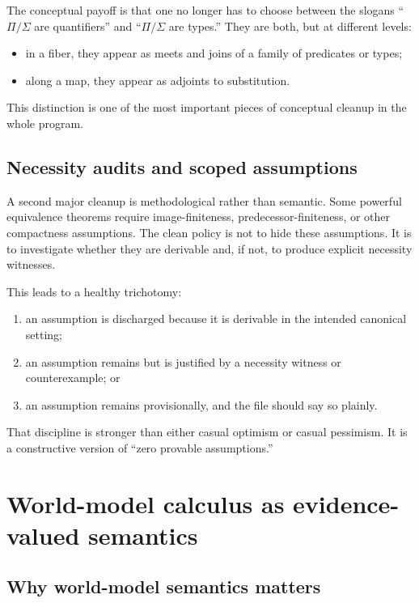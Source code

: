 \documentclass[11pt]{article}
\begin{document}
The conceptual payoff is that one no longer has to choose between the slogans ``$\Pi/\Sigma$ are quantifiers'' and ``$\Pi/\Sigma$ are types.'' They are both, but at different levels:

\begin{itemize}
  \item in a fiber, they appear as meets and joins of a family of predicates or types;
  \item along a map, they appear as adjoints to substitution.
\end{itemize}

This distinction is one of the most important pieces of conceptual cleanup in the whole program.

\subsection{Necessity audits and scoped assumptions}

A second major cleanup is methodological rather than semantic. Some powerful equivalence theorems require image-finiteness, predecessor-finiteness, or other compactness assumptions. The clean policy is not to hide these assumptions. It is to investigate whether they are derivable and, if not, to produce explicit necessity witnesses.

This leads to a healthy trichotomy:

\begin{enumerate}
  \item an assumption is discharged because it is derivable in the intended canonical setting;
  \item an assumption remains but is justified by a necessity witness or counterexample; or
  \item an assumption remains provisionally, and the file should say so plainly.
\end{enumerate}

That discipline is stronger than either casual optimism or casual pessimism. It is a constructive version of ``zero provable assumptions.''

\section{World-model calculus as evidence-valued semantics}

\subsection{Why world-model semantics matters}
\end{document}
